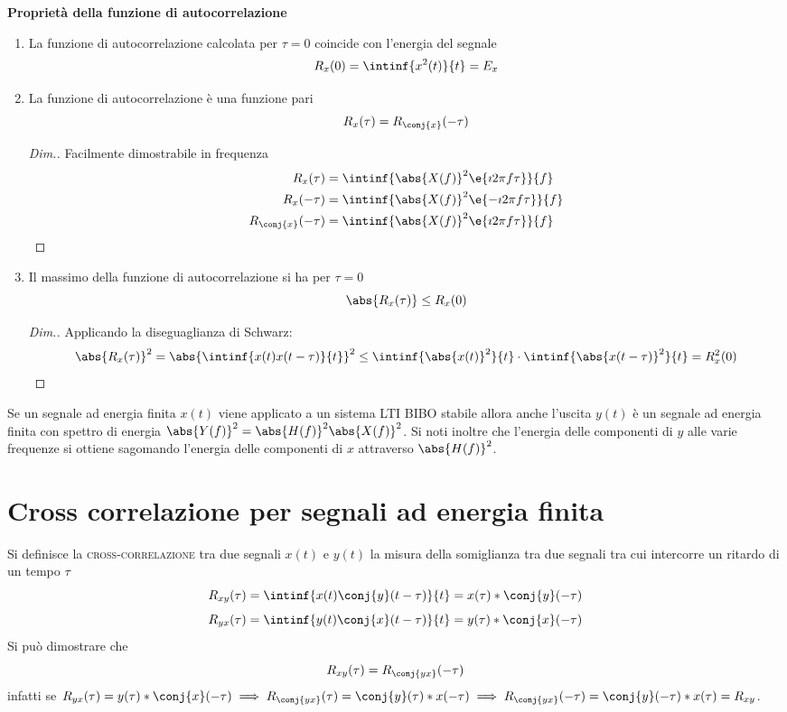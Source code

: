\textbf{Proprietà della funzione di autocorrelazione}
\begin{enumerate}
\item La funzione di autocorrelazione calcolata per $\tau=0$ coincide con l'energia del segnale
\[
	R_x(0)=\intinf{x^2(t)}{t}=E_x
\]

\item La funzione di autocorrelazione è una funzione pari
\[
	R_x(\tau)=R_\conj{x}(-\tau)
\]
\begin{proof}[Dim.]
Facilmente dimostrabile in frequenza
\begin{align*}
	R_x(\tau)&=\intinf{\abs{X(f)}^2\e{\imath 2\pi f\tau}}{f}\\
	R_x(-\tau)&=\intinf{\abs{X(f)}^2\e{-\imath 2\pi f\tau}}{f}\\
	R_\conj{x}(-\tau)&=\intinf{\abs{X(f)}^2\e{\imath 2\pi f\tau}}{f}
	\qedhere
\end{align*}
\end{proof}

\item Il massimo della funzione di autocorrelazione si ha per $\tau=0$
\[
	\abs{R_x(\tau)}\leq R_x(0)
\]
\begin{proof}[Dim.]
Applicando la diseguaglianza di Schwarz:
\[
	\abs{R_x(\tau)}^2=\abs{\intinf{x(t)x(t-\tau)}{t}}^2\leq\intinf{\abs{x(t)}^2}{t}\cdot\intinf{\abs{x(t-\tau)}^2}{t}=R_x^2(0)
	\qedhere
\]
\end{proof}
\end{enumerate}

\begin{nota}
	Se un segnale ad energia finita $x(t)$ viene applicato a un sistema LTI BIBO stabile allora anche l'uscita $y(t)$ è un segnale ad energia finita con spettro di energia $\abs{Y(f)}^2=\abs{H(f)}^2\abs{X(f)}^2$. Si noti inoltre che l'energia delle componenti di $y$ alle varie frequenze si ottiene sagomando l'energia delle componenti di $x$ attraverso $\abs{H(f)}^2$.
\end{nota}

\section{Cross correlazione per segnali ad energia finita}
Si definisce la \textsc{cross-correlazione} tra due segnali $x(t)$ e $y(t)$ la misura della somiglianza tra due segnali tra cui intercorre un ritardo di un tempo $\tau$
\begin{equation}
	R_{xy}(\tau)=\intinf{x(t)\conj{y}(t-\tau)}{t}=x(\tau)\ast \conj{y}(-\tau)
\end{equation}
\begin{equation}
	R_{yx}(\tau)=\intinf{y(t)\conj{x}(t-\tau)}{t}=y(\tau)\ast \conj{x}(-\tau)
\end{equation}
Si può dimostrare che 
\[
	R_{xy}(\tau)=R_\conj{yx}(-\tau)
\]
infatti se $R_{yx}(\tau)=y(\tau)\ast \conj{x}(-\tau)\implies R_\conj{yx}(\tau)=\conj{y}(\tau)\ast x(-\tau)\implies R_\conj{yx}(-\tau)=\conj{y}(-\tau)\ast x(\tau)=R_{xy}$.

